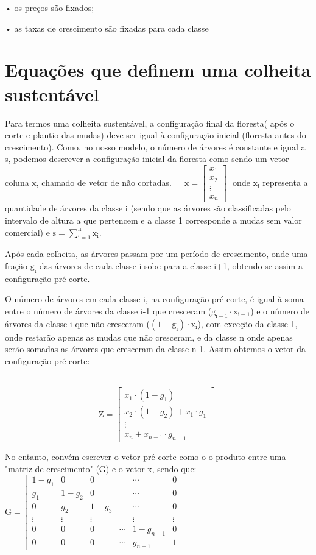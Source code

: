\documentclass[a4paper, 12pt]{article}
\begin{document}
•	os preços são fixados;

•	as taxas de crescimento são fixadas para cada classe


\section{Equações que definem uma colheita sustentável}

Para termos uma colheita sustentável, a configuração final da floresta( após o corte e plantio das mudas) deve ser igual à configuração inicial (floresta antes do crescimento).
Como, no nosso modelo, o número  de árvores é constante e igual a s, podemos descrever a configuração inicial da floresta como sendo um vetor coluna $\mathrm{x}$, chamado de vetor de não cortadas. $\;\;\;$
$\mathrm{x} = 
  \begin{bmatrix}
  x_1 \\
  x_2 \\
  \vdots  \\
  x_n 
\end{bmatrix}\;$
onde $\mathrm{x_i}$ representa a quantidade de árvores da classe i (sendo que as árvores são classificadas pelo intervalo de altura a que pertencem e a classe 1 corresponde a mudas sem valor comercial) e $\mathrm{s=\sum\limits_{i=1}^{n}x_i}$.
 
Após cada colheita, as árvores passam por um período de crescimento, onde uma fração $\mathrm{g_i}$ das árvores de cada classe i sobe para a classe i+1, obtendo-se assim a configuração pré-corte.
 
O número de árvores em cada classe i, na configuração pré-corte, é igual à soma entre o número de árvores da classe i-1 que cresceram ($\mathrm{g_{i-1}\cdot x_{i-1}}$) e o número de árvores da classe i que não cresceram ($\mathrm{(1-g_{i})\cdot x_i}$), com exceção da classe 1, onde restarão apenas as mudas que não cresceram, e da classe n onde apenas serão somadas as árvores que cresceram da classe n-1. Assim obtemos o vetor da configuração pré-corte:

$\;\;\;$
$$\mathrm{Z} = 
  \begin{bmatrix}
  x_1 \cdot (1-g_1) \\
  x_2 \cdot (1-g_2) + x_1 \cdot g_1\\
  \vdots  \\
  x_n + x_{n-1} \cdot g_{n-1}
\end{bmatrix}\;$$ 
 
No entanto, convém escrever o vetor pré-corte como o o produto entre uma "matriz de crescimento" (G) e o vetor x, sendo que: $\:$
$\mathrm{G} = \begin{bmatrix}
  1-g_1 & 0 & 0 & & \cdots & 0 \\
  g_1 & 1-g_2 & 0 & & \cdots & 0 \\
  0 & g_2 & 1-g_3 & & \cdots & 0 \\
  \vdots  & \vdots  & \vdots & & \vdots &\vdots \\
  0 & 0 & 0 & \cdots & 1-g_{n-1} & 0 \\
  0 & 0 & 0 & \cdots & g_{n-1} & 1
 \end{bmatrix}$
 
\end{document}
